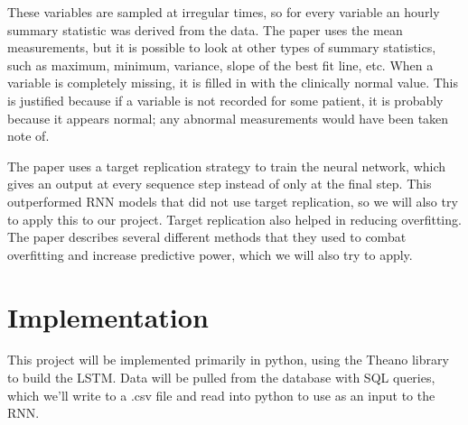 \documentclass[12pt]{article}
\begin{document}
These variables are sampled at irregular times, so for every variable an hourly summary statistic was derived from the data. The paper uses the mean measurements, but it is possible to look at other types of summary statistics, such as maximum, minimum, variance, slope of the best fit line, etc. When a variable is completely missing, it is filled in with the clinically normal value. This is justified because if a variable is not recorded for some patient, it is probably because it appears normal; any abnormal measurements would have been taken note of.

The paper uses a target replication strategy to train the neural network, which gives an output at every sequence step instead of only at the final step. This outperformed RNN models that did not use target replication, so we will also try to apply this to our project. Target replication also helped in reducing overfitting. The paper describes several different methods that they used to combat overfitting and increase predictive power, which we will also try to apply.

\section{Implementation}
This project will be implemented primarily in python, using the Theano library to build the LSTM. Data will be pulled from the database with SQL queries, which we'll write to a .csv file and read into python to use as an input to the RNN.
\end{document}
